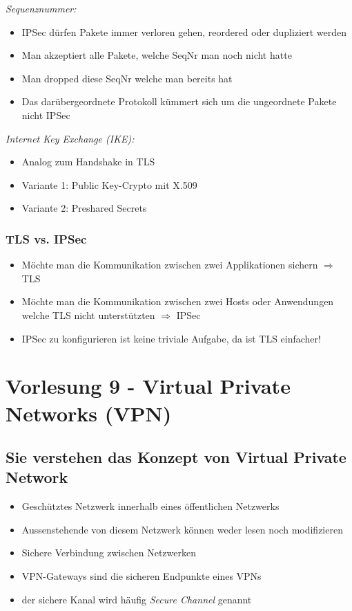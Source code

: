 \documentclass{report}
\theoremstyle{definition}
\theoremstyle{example}
\begin{document}
\textit{Sequenznummer:}
\begin{itemize}
	\item IPSec dürfen Pakete immer verloren gehen, reordered oder dupliziert werden
	\item Man akzeptiert alle Pakete, welche SeqNr man noch nicht hatte
	\item Man dropped diese SeqNr welche man bereits hat
	\item Das darübergeordnete Protokoll kümmert sich um die ungeordnete Pakete nicht IPSec 
\end{itemize}

\textit{Internet Key Exchange (IKE):}
\begin{itemize}
	\item Analog zum Handshake in TLS
	\item Variante 1: Public Key-Crypto mit X.509
	\item Variante 2: Preshared Secrets
\end{itemize}

	\subsection{TLS vs. IPSec}
\begin{itemize}
	\item Möchte man die Kommunikation zwischen zwei Applikationen sichern $\Rightarrow$ TLS
	\item Möchte man die Kommunikation zwischen zwei Hosts oder Anwendungen welche TLS nicht unterstützten $\Rightarrow$ IPSec
	\item IPSec zu konfigurieren ist keine triviale Aufgabe, da ist TLS einfacher!
\end{itemize}


\chapter{Vorlesung 9 - Virtual Private Networks (VPN)}

\section{Sie verstehen das Konzept von Virtual Private Network}
\begin{itemize}
	\item Geschütztes Netzwerk innerhalb eines öffentlichen Netzwerks 
	\item Aussenstehende von diesem Netzwerk können weder lesen noch modifizieren
	\item Sichere Verbindung zwischen Netzwerken
	\item VPN-Gateways sind die sicheren Endpunkte eines VPNs
	\item der sichere Kanal wird häufig \textit{Secure Channel} genannt
\end{itemize}
\end{document}
